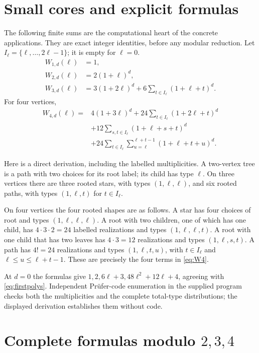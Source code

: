 \documentclass[11pt,letterpaper]{article}
\theoremstyle{definition}
\theoremstyle{remark}
\begin{document}
\section{Small cores and explicit formulas}\label{sec:cores}
The following finite sums are the computational heart of the concrete
applications. They are exact integer identities, before any modular
reduction. Let $I_\ell=\{\ell,\ldots,2\ell-1\}$; it is empty for
$\ell=0$.
\begin{align}
 W_{1,d}(\ell)&=1,\label{eq:W1}\\
 W_{2,d}(\ell)&=2(1+\ell)^d,\label{eq:W2}\\
 W_{3,d}(\ell)&=3(1+2\ell)^d+
 6\sum_{t\in I_\ell}(1+\ell+t)^d.\label{eq:W3}
\end{align}
For four vertices,
\begin{align}
 W_{4,d}(\ell)={}&4(1+3\ell)^d
 +24\sum_{t\in I_\ell}(1+2\ell+t)^d\nonumber\\
 &+12\sum_{s,t\in I_\ell}(1+\ell+s+t)^d\label{eq:W4}\\
 &+24\sum_{t\in I_\ell}\sum_{u=\ell}^{\ell+t-1}
 (1+\ell+t+u)^d.\nonumber
\end{align}

Here is a direct derivation, including the labelled multiplicities.
A two-vertex tree is a path with two choices for its root label; its
child has type $\ell$. On three vertices there are three rooted stars,
with types $(1,\ell,\ell)$, and six rooted paths, with types
$(1,\ell,t)$ for $t\in I_\ell$.

On four vertices the four rooted shapes are as follows. A star has four
choices of root and types $(1,\ell,\ell,\ell)$. A root with two children,
one of which has one child, has $4\cdot3\cdot2=24$ labelled realizations
and types $(1,\ell,\ell,t)$. A root with one child that has two leaves
has $4\cdot3=12$ realizations and types $(1,\ell,s,t)$.
A path has $4!=24$ realizations and types $(1,\ell,t,u)$, with
$t\in I_\ell$ and $\ell\le u\le\ell+t-1$.
These are precisely the four terms in \eqref{eq:W4}.

At $d=0$ the formulas give $1,2,6\ell+3,48\ell^2+12\ell+4$, agreeing
with \eqref{eq:firstpolys}. Independent Pr\"ufer-code enumeration in the
supplied program checks both the multiplicities and the complete total-type
distributions; the displayed derivation establishes them without code.

\section{Complete formulas modulo \texorpdfstring{$2,3,4$}{2,3,4}}
\label{sec:smallmod}
\end{document}
